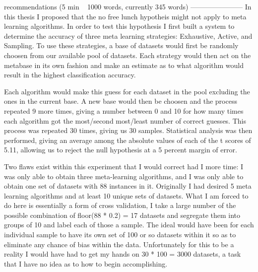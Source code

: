 recommendations (5 min ~ 1000 words, currently 345 words)
-----------------------
In this thesis I proposed that the no free lunch hypotheis might not apply to
meta learning algorithms. In order to test this hypothesis I first built a
system to determine the accuracy of three meta learning strategies:
Exhaustive, Active, and Sampling. To use these strategies, a base of
datasets would first be randomly choosen from our available pool of datasets.
Each strategy would then act on the metabase in its own fashion and make an
estimate as to what algorithm would result in the highest classification
accuracy.

Each algorithm would make this guess for each dataset in the pool excluding the
ones in the current base. A new base would then be choosen and the process
repeated 9 more times, giving a number between 0 and 10 for how many times
each algorithm got the most/second most/least number of correct guesses. This
process was repeated 30 times, giving us 30 samples. Statistical analysis was
then performed, giving an average among the absolute values of each of the t
scores of 5.11, allowing us to reject the null hypothesis at a 5 percent margin
of error.

Two flaws exist within this experiment that I would correct had I more time: I
was only able to obtain three meta-learning algorithms, and I was only able to
obtain one set of datasets with 88 instances in it. Originally I had desired 5
meta learning algorithms and at least 10 unique sets of datasets. What I am
forced to do here is essentially a form of cross validation, I take a large
number of the possible combination of floor(88 * 0.2) = 17 datasets and
segregate them into groups of 10 and label each of those a sample. The ideal
would have been for each individual sample to have its own set of 100 or so
datasets within it so as to eliminate any chance of bias within the data.
Unfortunately for this to be a reality I would have had to get my hands on
30 * 100 = 3000 datasets, a task that I have no idea as to how to begin
accomplishing.
